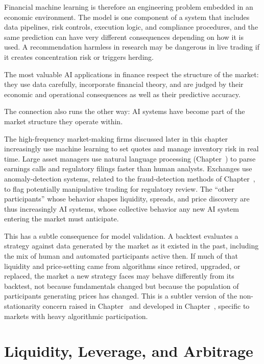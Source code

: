 \documentclass[../ai_in_finance]{subfiles}
\begin{document}
Financial machine learning is therefore an engineering problem embedded in an economic environment. The model is one component of a system that includes data pipelines, risk controls, execution logic, and compliance procedures, and the same prediction can have very different consequences depending on how it is used. A recommendation harmless in research may be dangerous in live trading if it creates concentration risk or triggers herding.

The most valuable AI applications in finance respect the structure of the market: they use data carefully, incorporate financial theory, and are judged by their economic and operational consequences as well as their predictive accuracy.

The connection also runs the other way: AI systems have become part of the market structure they operate within.

The high-frequency market-making firms discussed later in this chapter increasingly use machine learning to set quotes and manage inventory risk in real time. Large asset managers use natural language processing (Chapter~) to parse earnings calls and regulatory filings faster than human analysts. Exchanges use anomaly-detection systems, related to the fraud-detection methods of Chapter~, to flag potentially manipulative trading for regulatory review. The ``other participants'' whose behavior shapes liquidity, spreads, and price discovery are thus increasingly AI systems, whose collective behavior any new AI system entering the market must anticipate.

This has a subtle consequence for model validation. A backtest evaluates a strategy against data generated by the market as it existed in the past, including the mix of human and automated participants active then. If much of that liquidity and price-setting came from algorithms since retired, upgraded, or replaced, the market a new strategy faces may behave differently from its backtest, not because fundamentals changed but because the population of participants generating prices has changed. This is a subtler version of the non-stationarity concern raised in Chapter~ and developed in Chapter~, specific to markets with heavy algorithmic participation.

\section{Liquidity, Leverage, and Arbitrage}
\end{document}

